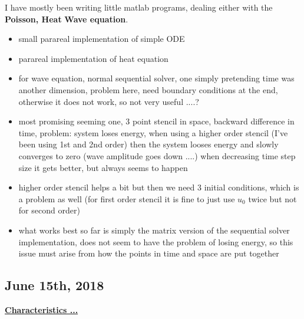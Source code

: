 \documentclass[a4paper, 11pt]{article}
\begin{document}
I have mostly been writing little matlab programs, dealing either with the \textbf{Poisson, Heat} \textbf{Wave equation}.
\begin{itemize}
	\item small parareal implementation of simple ODE
	\item parareal implementation of heat equation
	\item for wave equation, normal sequential solver, one simply pretending time was another dimension, problem here, need boundary conditions at the end, otherwise it does not work, so not very useful ....?
	\item most promising seeming one, 3 point stencil in space, backward difference in time, problem: system loses energy, when using a higher order stencil (I've been using 1st and 2nd order) then the system looses energy and slowly converges to zero (wave amplitude goes down ....) when decreasing time step size it gets better, but always seems to happen
	\item higher order stencil helps a bit but then we need 3 initial conditions, which is a problem as well (for first order stencil it is fine to just use $u_0$ twice but not for second order)
	\item what works best so far is simply the matrix version of the sequential solver implementation, does not seem to have the problem of losing energy, so this issue must arise from how the points in time and space are put together 
\end{itemize}


\subsection*{June 15th, 2018}

\underline{\textbf{Characteristics ... }}
\end{document}
